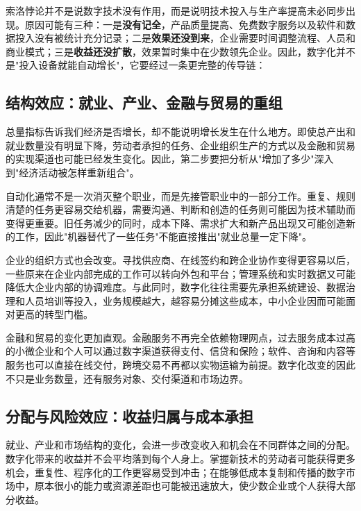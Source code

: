 索洛悖论并不是说数字技术没有作用，而是说明技术投入与生产率提高未必同步出现。原因可能有三种：一是\textbf{没有记全}，产品质量提高、免费数字服务以及软件和数据投入没有被统计充分记录；二是\textbf{效果还没到来}，企业需要时间调整流程、人员和商业模式；三是\textbf{收益还没扩散}，效果暂时集中在少数领先企业。因此，数字化并不是"投入设备就能自动增长"，它要经过一条更完整的传导链：

\begin{center}
\end{center}

\subsection{结构效应：就业、产业、金融与贸易的重组}

总量指标告诉我们经济是否增长，却不能说明增长发生在什么地方。即使总产出和就业数量没有明显下降，劳动者承担的任务、企业组织生产的方式以及金融和贸易的实现渠道也可能已经发生变化。因此，第二步要把分析从"增加了多少"深入到"经济活动被怎样重新组合"。

自动化通常不是一次消灭整个职业，而是先接管职业中的一部分工作。重复、规则清楚的任务更容易交给机器，需要沟通、判断和创造的任务则可能因为技术辅助而变得更重要。旧任务减少的同时，成本下降、需求扩大和新产品出现又可能创造新的工作，因此"机器替代了一些任务"不能直接推出"就业总量一定下降"。

企业的组织方式也会改变。寻找供应商、在线签约和跨企业协作变得更容易以后，一些原来在企业内部完成的工作可以转向外包和平台；管理系统和实时数据又可能降低大企业内部的协调难度。与此同时，数字化往往需要先承担系统建设、数据治理和人员培训等投入，业务规模越大，越容易分摊这些成本，中小企业因而可能面对更高的转型门槛。

金融和贸易的变化更加直观。金融服务不再完全依赖物理网点，过去服务成本过高的小微企业和个人可以通过数字渠道获得支付、信贷和保险；软件、咨询和内容等服务也可以直接在线交付，跨境交易不再都以实物运输为前提。数字化改变的因此不只是业务数量，还有服务对象、交付渠道和市场边界。

\subsection{分配与风险效应：收益归属与成本承担}

就业、产业和市场结构的变化，会进一步改变收入和机会在不同群体之间的分配。数字化带来的收益并不会平均落到每个人身上。掌握新技术的劳动者可能获得更多机会，重复性、程序化的工作更容易受到冲击；在能够低成本复制和传播的数字市场中，原本很小的能力或资源差距也可能被迅速放大，使少数企业或个人获得大部分收益。

